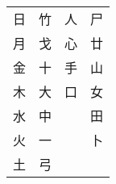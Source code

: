 \documentclass{article}
\begin{document}
\begin{CJK}{UTF8}{min}
	\begin{center}


	\begin{tabular}{|c|c|c|c|}
		\hline
		&&&\\
		\hline
		日       &竹	   &人	     &尸       \\
		月       &戈	   &心       &廿       \\
		金       &十       &手       &山       \\
		木       &大       &口       &女       \\
		水       &中       &         &田       \\
		火       &一       &         &卜       \\
		土       &弓       &         &         \\
		\hline
	\end{tabular}

	\end{center}

\end{CJK}
\end{document}
